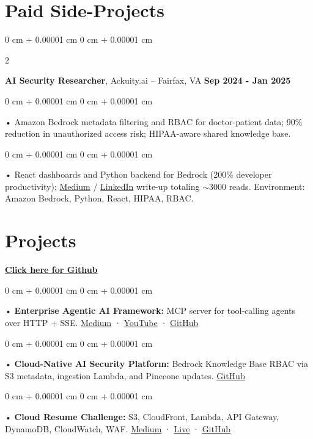 \documentclass[10pt, letterpaper]{article}
\newenvironment{onecolentry}{
    \begin{adjustwidth}{
        0 cm + 0.00001 cm
    }{
        0 cm + 0.00001 cm
    }
}{
    \end{adjustwidth}
} %
\newenvironment{twocolentry}[2][]{
    \onecolentry
    \def\secondColumn{#2}
    \setcolumnwidth{\fill, 4.5 cm}
    \begin{paracol}{2}
}{
    \switchcolumn \raggedleft \secondColumn
    \end{paracol}
    \endonecolentry
} %
\begin{document}
    \section{Paid Side-Projects}
            \vspace{2 pt }
                    \begin{twocolentry}{
            \textbf{Sep 2024 - Jan 2025}
        }
            \textbf{AI Security Researcher}, Ackuity.ai -- Fairfax, VA\end{twocolentry}

        \begin{onecolentry}
             • Amazon Bedrock metadata filtering and RBAC for doctor-patient data; 90\% reduction in unauthorized access risk; HIPAA-aware shared knowledge base.
        \end{onecolentry}
        \begin{onecolentry}
             • React dashboards and Python backend for Bedrock (200\% developer productivity); \href{https://medium.com/@sreenikethaathreya/building-a-permission-aware-genai-application-on-amazon-bedrock-8fdc2410dd43}{Medium} / \href{https://www.linkedin.com/pulse/building-permission-aware-genai-application-amazon-bedrock-aathreya-g7nme/}{LinkedIn} write-up totaling $\sim$3000 reads. Environment: Amazon Bedrock, Python, React, HIPAA, RBAC.
        \end{onecolentry}

\section{Projects}
    \vspace{2 pt}
\textbf{\href{https://github.com/daedalus-s}{Click here for Github}}
\begin{onecolentry}
     • \textbf{Enterprise Agentic AI Framework:} MCP server for tool-calling agents over HTTP + SSE. \href{https://medium.com/@sreenikethaathreya/get-good-at-using-ai-noob-5d2576203112}{Medium} · \href{https://www.youtube.com/watch?v=op2gTYyFb5U}{YouTube} · \href{https://github.com/daedalus-s/dota2-mcp-server}{GitHub}
\end{onecolentry}
\begin{onecolentry}
     • \textbf{Cloud-Native AI Security Platform:} Bedrock Knowledge Base RBAC via S3 metadata, ingestion Lambda, and Pinecone updates. \href{https://github.com/daedalus-s/bedrock-acl-metadata}{GitHub}
\end{onecolentry}
\begin{onecolentry}
     • \textbf{Cloud Resume Challenge:} S3, CloudFront, Lambda, API Gateway, DynamoDB, CloudWatch, WAF. \href{https://medium.com/@sreenikethaathreya/cloud-resume-challenge-c4f17c3d53ff}{Medium} · \href{https://sreenikethaathreya.com}{Live} · \href{https://github.com/daedalus-s/resume-website}{GitHub}
\end{onecolentry}
\vspace{2 pt}
\end{document}

